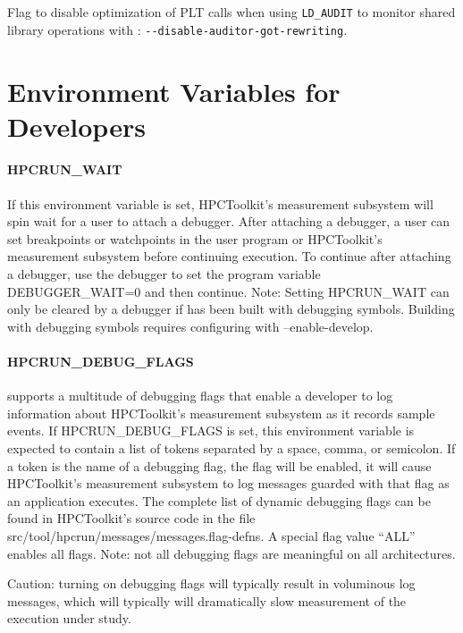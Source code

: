 \parg
Flag to disable optimization of PLT calls when using \verb|LD_AUDIT|  to monitor shared library operations with \hpcrun: \verb|--disable-auditor-got-rewriting|.

\section{Environment Variables for Developers}
\label{system-env}

\paragraph{HPCRUN\_WAIT}

If this environment variable is set, HPCToolkit's measurement subsystem
will spin wait for a user to attach a debugger. After attaching a
debugger, a user can set breakpoints or watchpoints in the user
program or HPCToolkit's measurement subsystem before continuing
execution. To continue after attaching a debugger, use the debugger
to set the program variable DEBUGGER\_WAIT=0 and then continue.
Note: Setting HPCRUN\_WAIT can only be cleared by a debugger
if \HPCToolkit{} has been built with debugging symbols.
Building \HPCToolkit{} with debugging symbols requires
configuring \HPCToolkit{} with --enable-develop.

\paragraph{HPCRUN\_DEBUG\_FLAGS}

\HPCToolkit{} supports a multitude of debugging flags that enable a
developer to log information about HPCToolkit's measurement subsystem
as it records sample events. If HPCRUN\_DEBUG\_FLAGS is set, this
environment variable is expected to contain a list of tokens separated
by a space, comma, or semicolon. If a token is the name of a debugging
flag, the flag will be enabled, it will cause HPCToolkit's measurement
subsystem to log messages guarded with that flag as an application
executes. The complete list of dynamic debugging flags can be found
in HPCToolkit's source code in the file
src/tool/hpcrun/messages/messages.flag-defns. A special flag value ``ALL'' enables all flags. 
\parg
Note: not all debugging flags are
meaningful on all architectures. 

\parg 
Caution: turning on debugging flags
will typically result in voluminous log messages, which will typically will 
dramatically slow measurement of the execution under study.

